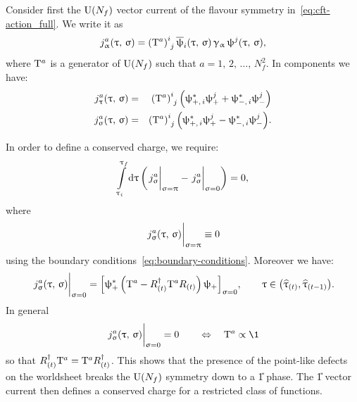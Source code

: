Consider first the $\mathrm{U}(N_f)$ vector current of the flavour symmetry in~\eqref{eq:cft-action_full}.
We write it as
\begin{equation}
  j_{\alpha}^a ( \tau,\, \sigma )
  =
  \tensor{\qty( \rT^a )}{^i_j}\,
  \bpsi_i( \tau,\, \sigma )\, \gamma_{\alpha}\, \psi^j( \tau,\, \sigma ),
\end{equation}
where $\mathrm{T}^a$ is a generator of $\mathrm{U}(N_f)$ such that $a = 1,\, 2,\, \dots,\, N_f^2$.\footnotemark{}
In components we have:
\begin{eqnarray}
  j^a_{\tau}( \tau,\, \sigma )
  & = &
  \tensor{\qty( \rT^a )}{^i_j}\,
  \qty( \psi^*_{+,\, i} \psi^j_+ + \psi^*_{-,\, i} \psi^j_- )
  \\
  j^a_{\sigma}( \tau,\, \sigma )
  & = &
  \tensor{\qty( \rT^a )}{^i_j}\,
  \qty( \psi^*_{+,\, i} \psi^j_+ - \psi^*_{-,\, i} \psi^j_- ).
\end{eqnarray}

In order to define a conserved charge, we require:
\begin{equation}
  \finiteint{\tau}{\tau_i}{\tau_f}
  \qty(
    \eval{j_{\sigma}^a}_{\sigma = \pi} - \eval{j_{\sigma}^a}_{\sigma = 0}
  )
  =
  0,
\end{equation}
where
\begin{equation}
  \eval{j_{\sigma}^a( \tau,\, \sigma )}_{\sigma = \pi} \equiv 0
\end{equation}
using the boundary conditions~\eqref{eq:boundary-conditions}.
Moreover we have:
\begin{equation}
  \eval{j_{\sigma}^a( \tau,\, \sigma )}_{\sigma = 0}
  =
  \qty[
    \psi^*_+\,
    \qty( \rT^a - R_{(t)}^{\dagger} \rT^a R_{(t)} )\,
    \psi_+
  ]_{\sigma = 0},
  \qquad
  \tau \in \qty( \htau_{(t)}, \htau_{(t-1)} ).
\end{equation}
In general
\begin{equation}
  \eval{j_{\sigma}^a( \tau,\, \sigma )}_{\sigma = 0}
  =
  0
  \qquad
  \Leftrightarrow
  \quad
  \rT^a \propto \1
\end{equation}
so that $R_{(t)}^{\dagger} \mathrm{T}^a = \mathrm{T}^a R_{(t)}^{\dagger}$.
This shows that the presence of the point-like defects on the worldsheet breaks the $\mathrm{U}(N_f)$ symmetry down to a \U{1} phase.\footnotemark{}
The \U{1} vector current then defines a conserved charge for a restricted class of functions.

